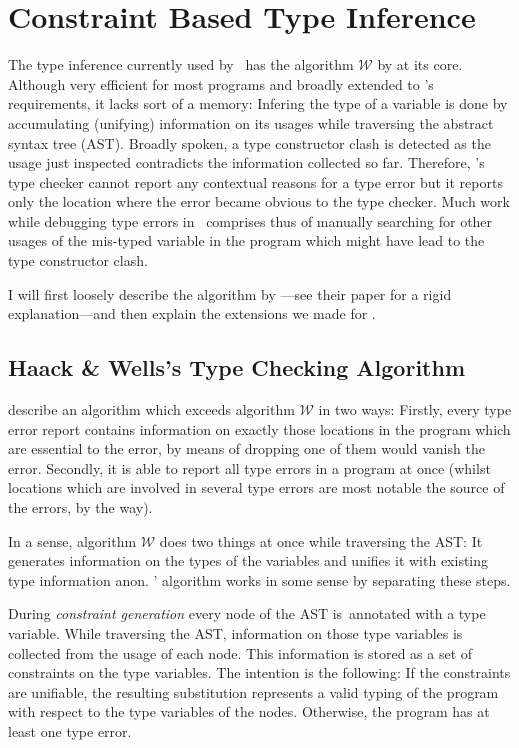 
\section{Constraint Based Type Inference}
\label{sec:typeinfer}

The type inference currently used by \ocaml\ has the algorithm $\mathcal W$ by
\citet{milner78} at its core.
Although very efficient for most programs and broadly extended to \ocaml's 
requirements, it lacks sort of a memory:
Infering the type of a variable is done by accumulating (unifying) information
on its usages while traversing the abstract syntax tree (AST).
Broadly spoken, a type constructor clash is detected as the usage just
inspected contradicts the information collected so far.
Therefore, \ocaml's type checker cannot report any contextual reasons for a type
error but it reports only the location where the error became obvious to the
type checker.
Much work while debugging type errors in \ocaml\ comprises thus of manually
searching for other usages of the mis-typed variable in the program which might
have lead to the type constructor clash.

I will first loosely describe the algorithm by \citeauthor{haackwells04}---see
their \citeyear{haackwells04} paper for a rigid explanation---and then explain
the extensions we made for \easyocaml.


\subsection{Haack \& Wells's Type Checking Algorithm}

\citet{haackwells04} describe an algorithm which exceeds algorithm $\mathcal W$
in two ways:
Firstly, every type error report contains information on exactly those
locations in the program which are essential to the error, by means of dropping
one of them would vanish the error.
Secondly, it is able to report all type errors in a program at once (whilst
locations which are involved in several type errors are most notable the source
of the errors, by the way).

In a sense, algorithm $\mathcal W$ does two things at once while traversing the 
AST: It generates information on the types of the variables and unifies it with
existing type information anon.  \citeauthor{haackwells04}' algorithm works in
some sense by separating these steps.

During \emph{constraint generation} every node of the AST is\wha\ annotated with
a type variable. While traversing the AST, information on those type variables
is collected from the usage of each node. This information is stored as a set of
constraints on the type variables.
The intention is the following: If the constraints are unifiable, the resulting
substitution represents a valid typing of the program with respect to the type
variables of the nodes.
Otherwise, the program has at least one type error.

